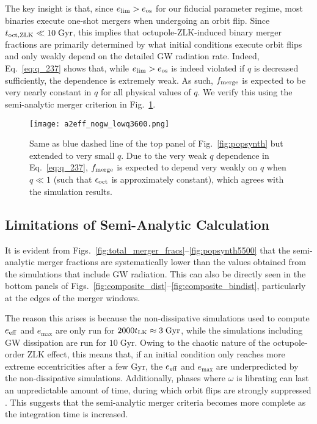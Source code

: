 \documentclass[
        fleqn,
        usenatbib,
    ]{mnras}
\newlength{\colummwidth}
\begin{document}
The key insight is that, since $e_{\lim} > e_{\rm os}$ for our fiducial
parameter regime, most binaries execute one-shot mergers when undergoing an
orbit flip. Since $t_{\rm oct, ZLK} \ll 10\;\mathrm{Gyr}$, this implies that
octupole-ZLK-induced binary merger fractions are primarily determined by what
initial conditions execute orbit flips and only weakly depend on the detailed GW
radiation rate. Indeed, Eq.~\eqref{eq:q_237} shows that, while $e_{\lim} >
e_{\rm os}$ is indeed violated if $q$ is decreased sufficiently, the dependence
is extremely weak. As such, $f_{\rm merge}$ is expected to be very nearly
constant in $q$ for all physical values of $q$. We verify this using the
semi-analytic merger criterion in Fig.~\ref{fig:popsynth_lowq}.
\begin{figure}
    \centering
    \texttt{[image: a2eff\_nogw\_lowq3600.png]}
    \caption{Same as blue dashed line of the top panel of
    Fig.~\ref{fig:popsynth} but extended to very small $q$. Due to the very weak
    $q$ dependence in Eq.~\eqref{eq:q_237}, $f_{\rm merge}$ is expected to
    depend very weakly on $q$ when $q \ll 1$ (such that $\epsilon_{\rm oct}$ is
    approximately constant), which agrees with the simulation
    results.}\label{fig:popsynth_lowq}
\end{figure}

\subsection{Limitations of Semi-Analytic Calculation}\label{ss:completeness}

It is evident from Figs.~\ref{fig:total_merger_fracs}--\ref{fig:popsynth5500}
that the semi-analytic merger fractions are systematically lower than the values
obtained from the simulations that include GW radiation. This can also be
directly seen in the bottom panels of
Figs.~\ref{fig:composite_dist}--\ref{fig:composite_bindist}, particularly at the
edges of the merger windows.

The reason this arises is because the non-dissipative simulations used to
compute $e_{\rm eff}$ and $e_{\max}$ are only run for $2000 t_{\rm LK} \approx
3\;\mathrm{Gyr}$, while the simulations including GW dissipation are run for
$10\;\mathrm{Gyr}$. Owing to the chaotic nature of the octupole-order ZLK
effect, this means that, if an initial condition only reaches more extreme
eccentricities after a few Gyr, the $e_{\rm eff}$ and $e_{\max}$ are
underpredicted by the non-dissipative simulations. Additionally, phases where
$\omega$ is librating can last an unpredictable amount of time, during which
orbit flips are strongly suppressed \citep{katz2011long}. This suggests that the
semi-analytic merger criteria becomes more complete as the integration time is
increased.
\end{document}
